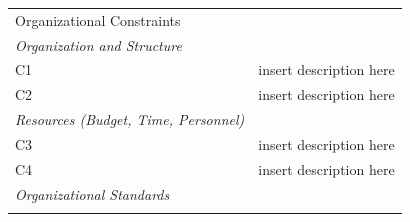 \documentclass[]{article}
\begin{document}
\begin{longtable}[c]{@{}ll@{}}
\toprule\addlinespace
\begin{minipage}[b]{0.19\columnwidth}\raggedright
Organizational Constraints
\end{minipage}
\\\addlinespace
\midrule\endhead
\begin{minipage}[t]{0.19\columnwidth}\raggedright
\emph{Organization and Structure}
\end{minipage}
\\\addlinespace
\begin{minipage}[t]{0.19\columnwidth}\raggedright
C1
\end{minipage} & \begin{minipage}[t]{0.75\columnwidth}\raggedright
insert description here
\end{minipage}
\\\addlinespace
\begin{minipage}[t]{0.19\columnwidth}\raggedright
C2
\end{minipage} & \begin{minipage}[t]{0.75\columnwidth}\raggedright
insert description here
\end{minipage}
\\\addlinespace
\begin{minipage}[t]{0.19\columnwidth}\raggedright
\emph{Resources (Budget, Time, Personnel)}
\end{minipage}
\\\addlinespace
\begin{minipage}[t]{0.19\columnwidth}\raggedright
C3
\end{minipage} & \begin{minipage}[t]{0.75\columnwidth}\raggedright
insert description here
\end{minipage}
\\\addlinespace
\begin{minipage}[t]{0.19\columnwidth}\raggedright
C4
\end{minipage} & \begin{minipage}[t]{0.75\columnwidth}\raggedright
insert description here
\end{minipage}
\\\addlinespace
\begin{minipage}[t]{0.19\columnwidth}\raggedright
\emph{Organizational Standards}
\end{minipage}
\\\addlinespace
\begin{minipage}[t]{0.19\columnwidth}\raggedright

\end{minipage}
\end{longtable}
\end{document}

